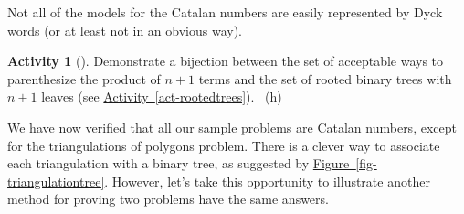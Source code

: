 \documentclass[10pt,]{book}
\theoremstyle{plain}
\theoremstyle{definition}
\theoremstyle{definition}
\theoremstyle{definition}
\newtheorem{activity}[project]{Activity}
\numberwithin{equation}{chapter}
\begin{document}
\hypertarget{p-1016}{}%
Not all of the models for the Catalan numbers are easily represented by Dyck words (or at least not in an obvious way).%
\begin{activity}[]\label{activity-173}
\hypertarget{p-1017}{}%
Demonstrate a bijection between the set of acceptable ways to parenthesize the product of \(n+1\) terms and the set of rooted binary trees with \(n+1\) leaves (see \hyperref[act-rootedtrees]{Activity~\ref{act-rootedtrees}}).%
~{\tiny (h)}\end{activity}
\hypertarget{p-1019}{}%
We have now verified that all our sample problems are Catalan numbers, except for the triangulations of polygons problem.  There is a clever way to associate each triangulation with a binary tree, as suggested by \hyperref[fig-triangulationtree]{Figure~\ref{fig-triangulationtree}}.  However, let's take this opportunity to illustrate another method for proving two problems have the same answers.%
\end{document}
